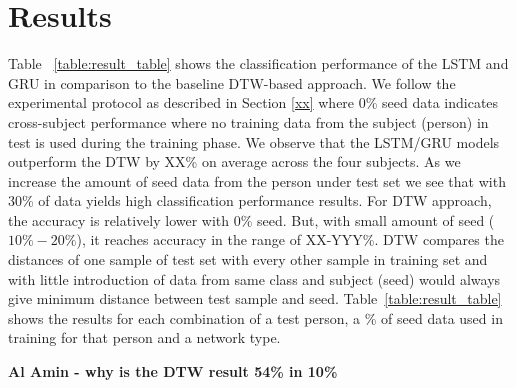 \documentclass[10pt,twocolumn,letterpaper]{article}
\begin{document}
\section{Results}

Table ~\ref{table:result_table} shows the classification 
performance of the LSTM and GRU in comparison to the baseline DTW-based approach. We follow the experimental protocol as described in 
Section \ref{xx} where 0\% seed data indicates cross-subject performance where no training data from the subject (person) in test is used during the training phase. 
We observe that the LSTM/GRU models outperform the DTW by XX\% on average across the four subjects. As we increase the amount of seed data from the person 
under test set we see that with 30\% of data yields high classification performance results.  For DTW approach, the 
 accuracy is relatively lower with $0\%$ seed. But, with small amount of seed ($10\%-20\%$), it reaches accuracy in the range of XX-YYY\%. DTW compares the 
 distances of one sample of test set with every other sample in training set and with little introduction of data from same class and subject (seed) would always give minimum distance between test sample and seed. Table~\ref{table:result_table} shows the results for each combination of a test person, a \% of seed data used in training for that person and a network type.
 
 
 {\bf Al Amin - why is the DTW result 54\% in 10\%}
 
\end{document}
